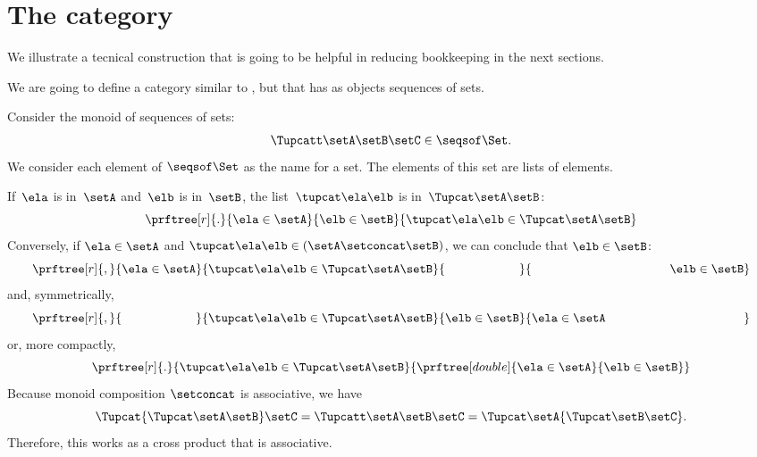 \section{The \SetStar category}
\label{sec:SetStar}

We illustrate a tecnical construction that is going to be helpful in reducing bookkeeping in the next sections.

We are going to define a category similar to \Set, but that has as objects sequences of sets.

Consider the monoid of sequences of sets:
%
\begin{equation}
    \label{eq:sets-monoid}
    \Tupcatt \setA  \setB  \setC \in \seqsof\Set.
\end{equation}
%
We consider each element of $\seqsof\Set$ as the name for a set.
The elements of this set are lists of elements.

If~$\ela$ is in~$\setA$ and~$\elb$ is in~$\setB$, the list~$\tupcat \ela \elb$ is in~$\Tupcat \setA \setB$:
%
\begin{equation}
    \label{eq:sets-monoid-axiom1}
    \prftree[r]{.}{
        \ela \in \setA
    }{
        \elb \in \setB
    }{ 
        \tupcat \ela \elb \in \Tupcat \setA \setB 
    }
\end{equation}
%
Conversely, if $\ela \in \setA$ and $\tupcat \ela \elb \in (\setA \setconcat \setB)$, we can conclude that $\elb \in \setB$:
%
\begin{equation}
    \label{eq:sets-monoid-axiom2}
    \prftree[r]{,}{
        \ela \in \setA
    }{ 
        \tupcat \ela \elb \in \Tupcat \setA  \setB
    }{
        \phantom{\elb \in \setB}
    }{  
        \rule{39mm}{0pt} \elb \in  \setB 
    }
\end{equation}
% 
and, symmetrically, 
% 
\begin{equation}
    \label{eq:sets-monoid-axiom3}
    \prftree[r]{,}{
        \phantom{\ela \in \setA}
    }{
        \tupcat \ela \elb \in \Tupcat \setA \setB  
    }{
        \elb \in \setB
    }{  
        \ela \in  \setA \rule{39mm}{0pt}
    }
\end{equation}
%
or, more compactly,
% 
\begin{equation}
    \label{eq:sets-monoid-axiom3}
    \prftree[r]{.}{
        \tupcat \ela \elb \in \Tupcat \setA \setB  
    }{
        \prftree[double]{
            \ela \in \setA
        }{
            \elb \in \setB
        }
    }
\end{equation}
%
Because monoid composition $\setconcat$ is associative, we have
%
\begin{equation}
    \label{eq:sets-monoid-comp}
    \Tupcat {\Tupcat \setA  \setB}  \setC  =
    \Tupcatt \setA    \setB \setC  =
    \Tupcat   \setA  {\Tupcat \setB  \setC}.
\end{equation}
%
Therefore, this works as a cross product that is associative.

